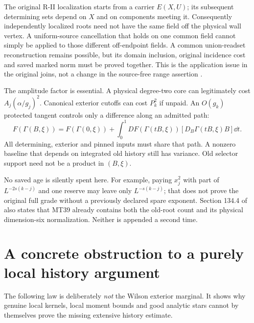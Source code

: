 \documentclass[11pt,letterpaper]{article}
\theoremstyle{remark}\newtheorem{remark}[theorem]{Remark}
\begin{document}
The original R-II localization starts from a carrier \(E(X,U)\); its subsequent determining sets depend on \(X\) and on components meeting it. Consequently independently localized roots need not have the same field off the physical wall vertex. A uniform-source cancellation that holds on one common field cannot simply be applied to those different off-endpoint fields. A common union-readset reconstruction remains possible, but its domain inclusion, original incidence cost and saved marked norm must be proved together. This is the application issue in the original joins, not a change in the source-free range assertion \cite{RGII}.

The amplitude factor is essential. A physical degree-two core can legitimately cost \(A_j(\alpha/g_j)^2\). Canonical exterior cutoffs can cost \(P_k^2\) if unpaid. An \(O(g_k)\) protected tangent controls only a difference along an admitted path:
\[
 F(\Gamma(B,\xi))=F(\Gamma(0,\xi))+
 \int_0^1DF(\Gamma(tB,\xi))[D_B\Gamma(tB,\xi)B]\dd t.
\]
All determining, exterior and pinned inputs must share that path. A nonzero baseline that depends on integrated old history still has variance. Old selector support need not be a product in \((B,\xi)\).

No saved age is silently spent here. For example, paying \(x_j^2\) with part of \(L^{-2s(k-j)}\) and one reserve may leave only \(L^{-s(k-j)}\); that does not prove the original full grade without a previously declared spare exponent. Section 134.4 of~\cite[pp.~693, 1023--1024]{W} also states that MT39 already contains both the old-root count and its physical dimension-six normalization. Neither is appended a second time.

\section{A concrete obstruction to a purely local history argument}

The following law is deliberately \emph{not} the Wilson exterior marginal. It shows why genuine local kernels, local moment bounds and good analytic stars cannot by themselves prove the missing extensive history estimate.
\end{document}
